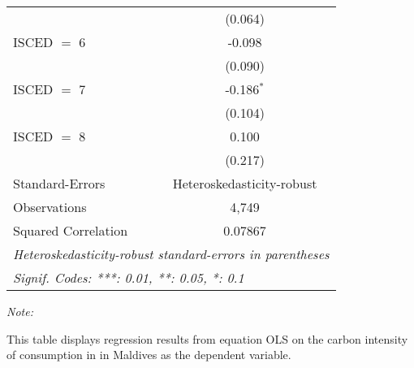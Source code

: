 \begin{table}[htbp!]
\begin{adjustbox}{width = 1\textwidth, max height = 0.95\textheight, center}
\begin{threeparttable}[b]
\begin{tabular}{lc}
                                & (0.064)\\   
            ISCED $=$ 6         & -0.098\\   
                                & (0.090)\\   
            ISCED $=$ 7         & -0.186$^{*}$\\   
                                & (0.104)\\   
            ISCED $=$ 8         & 0.100\\   
                                & (0.217)\\   
            \midrule 
            Standard-Errors     & Heteroskedasticity-robust \\   
            Observations        & 4,749\\  
            Squared Correlation & 0.07867\\  
            \midrule \midrule
            \multicolumn{2}{l}{\emph{Heteroskedasticity-robust standard-errors in parentheses}}\\
            \multicolumn{2}{l}{\emph{Signif. Codes: ***: 0.01, **: 0.05, *: 0.1}}\\
         \end{tabular}
         
         \begin{tablenotes}\item \medskip \textit{Note:}
            \item This table displays regression results from equation OLS on the carbon intensity of consumption in  in Maldives as the dependent variable. 
         \end{tablenotes}
      \end{threeparttable}
   \end{adjustbox}
\end{table}



